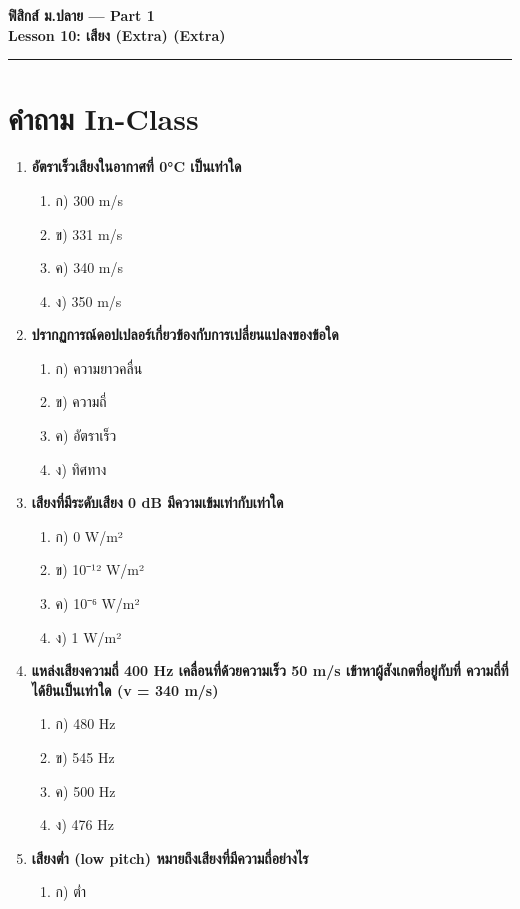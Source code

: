 \documentclass[12pt]{article}
\begin{document}
\begin{center}
{\LARGE\textbf{ฟิสิกส์ ม.ปลาย — Part 1}}\\[0.3em]
{\Large\textbf{Lesson 10: เสียง (Extra) (Extra)}}\\[0.5em]
\rule{0.8\linewidth}{0.5pt}
\end{center}
\section*{คำถาม In-Class}
\begin{enumerate}
\item \textbf{อัตราเร็วเสียงในอากาศที่ 0°C เป็นเท่าใด}
\begin{enumerate}
\item ก) 300 m/s
\item ข) 331 m/s
\item ค) 340 m/s
\item ง) 350 m/s
\end{enumerate}
\item \textbf{ปรากฏการณ์ดอปเปลอร์เกี่ยวข้องกับการเปลี่ยนแปลงของข้อใด}
\begin{enumerate}
\item ก) ความยาวคลื่น
\item ข) ความถี่
\item ค) อัตราเร็ว
\item ง) ทิศทาง
\end{enumerate}
\item \textbf{เสียงที่มีระดับเสียง 0 dB มีความเข้มเท่ากับเท่าใด}
\begin{enumerate}
\item ก) 0 W/m²
\item ข) 10⁻¹² W/m²
\item ค) 10⁻⁶ W/m²
\item ง) 1 W/m²
\end{enumerate}
\item \textbf{แหล่งเสียงความถี่ 400 Hz เคลื่อนที่ด้วยความเร็ว 50 m/s เข้าหาผู้สังเกตที่อยู่กับที่ ความถี่ที่ได้ยินเป็นเท่าใด (v = 340 m/s)}
\begin{enumerate}
\item ก) 480 Hz
\item ข) 545 Hz
\item ค) 500 Hz
\item ง) 476 Hz
\end{enumerate}
\item \textbf{เสียงต่ำ (low pitch) หมายถึงเสียงที่มีความถี่อย่างไร}
\begin{enumerate}
\item ก) ต่ำ

\end{enumerate}
\end{enumerate}
\end{document}
